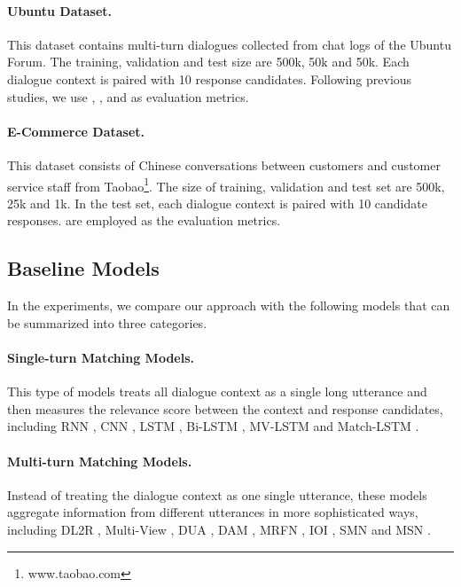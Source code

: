 \documentclass[11pt,a4paper]{article}
\begin{document}
\paragraph{Ubuntu Dataset.} This dataset \cite{DBLP:conf/sigdial/LowePSP15} contains multi-turn dialogues collected from chat logs of the Ubuntu Forum. The training, validation and test size are 500k, 50k and 50k. Each dialogue context is paired with 10 response candidates. Following previous studies, we use , ,  and  as evaluation metrics.

\paragraph{E-Commerce Dataset.} This dataset \cite{DBLP:conf/coling/ZhangLZZL18} consists of Chinese conversations between customers and customer service staff from Taobao\footnote{www.taobao.com}. The size of training, validation and test set are 500k, 25k and 1k. In the test set, each dialogue context is paired with 10 candidate responses.  are employed as the evaluation metrics. 

\subsection{Baseline Models}
In the experiments, we compare our approach with the following models that can be summarized into three categories. 

\paragraph{Single-turn Matching Models.} This type of models treats all dialogue context as a single long utterance and then measures the relevance score between the context and response candidates, including RNN \cite{DBLP:conf/sigdial/LowePSP15}, CNN \cite{DBLP:conf/sigdial/LowePSP15}, LSTM \cite{DBLP:conf/sigdial/LowePSP15}, Bi-LSTM \cite{DBLP:journals/corr/KadlecSK15},  MV-LSTM \cite{DBLP:conf/ijcai/WanLXGPC16} and Match-LSTM \cite{DBLP:conf/naacl/WangJ16}.

\paragraph{Multi-turn Matching Models.} Instead of treating the dialogue context as one single utterance, these models aggregate information from different utterances in more sophisticated ways, including DL2R \cite{DBLP:conf/sigir/YanSW16}, Multi-View \cite{DBLP:conf/emnlp/ZhouDWZYTLY16}, DUA \cite{DBLP:conf/coling/ZhangLZZL18}, DAM \cite{DBLP:conf/acl/WuLCZDYZL18}, MRFN \cite{10.1145/3289600.3290985}, IOI \cite{DBLP:conf/acl/TaoWXHZY19}, SMN \cite{DBLP:conf/acl/WuWXZL17} and MSN \cite{DBLP:conf/emnlp/YuanZLLZHH19}. 
\end{document}
